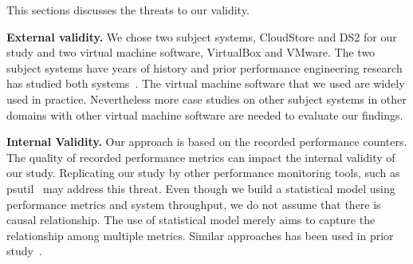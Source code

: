 This sections discusses the threats to our validity.

\noindent \textbf{External validity.}
We chose two subject systems, CloudStore and DS2 for our study and two virtual machine software, VirtualBox and VMware. The two subject systems have years of history and prior performance engineering research has studied both systems~\cite{jackicsm2009,Nguyen:2012:ADP:2188286.2188344,tarekmsr16}. The virtual machine software that we used are widely used in practice. Nevertheless more case studies on other subject systems in other domains with other virtual machine software are needed to evaluate our findings.


\noindent \textbf{Internal Validity.}
Our approach is based on the recorded performance counters. The quality of recorded performance metrics can impact the internal validity of our study. Replicating our study by other performance monitoring tools, such as psutil~\cite{psutil} may address this threat. Even though we build a statistical model using performance metrics and system throughput, we do not assume that there is causal relationship. The use of statistical model merely 
aims to capture the relationship among multiple metrics. Similar approaches has been used in prior study~\cite{Cohen:2005:CIC:1095810.1095821, Shang:2015:ADP:2668930.2688052, xiong2013vperfguard}. 



